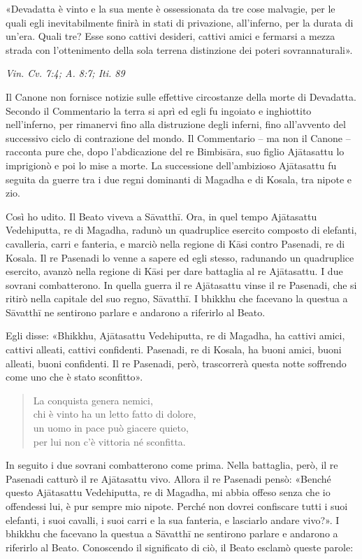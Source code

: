 «Devadatta è vinto e la sua mente è ossessionata da tre cose malvagie,
per le quali egli inevitabilmente finirà in stati di privazione,
all’inferno, per la durata di un’era. Quali tre? Esse sono cattivi
desideri, cattivi amici e fermarsi a mezza strada con l’ottenimento
della sola terrena distinzione dei poteri sovrannaturali».


\emph{Vin. Cv. 7:4; A. 8:7; Iti. 89}


 Il Canone non fornisce notizie sulle effettive
circostanze della morte di Devadatta. Secondo il Commentario la terra si
aprì ed egli fu ingoiato e inghiottito nell’inferno, per rimanervi fino
alla distruzione degli inferni, fino all’avvento del successivo ciclo di
contrazione del mondo. Il Commentario – ma non il Canone – racconta pure
che, dopo l’abdicazione del re Bimbisāra, suo figlio Ajātasattu lo
imprigionò e poi lo mise a morte. La successione dell’ambizioso
Ajātasattu fu seguita da guerre tra i due regni dominanti di Magadha e
di Kosala, tra nipote e zio.


 Così ho udito. Il Beato viveva a Sāvatthī. Ora, in quel
tempo Ajātasattu Vedehiputta, re di Magadha, radunò un quadruplice
esercito composto di elefanti, cavalleria, carri e fanteria, e marciò
nella regione di Kāsi contro Pasenadi, re di Kosala. Il re Pasenadi lo
venne a sapere ed egli stesso, radunando un quadruplice esercito, avanzò
nella regione di Kāsi per dare battaglia al re Ajātasattu. I due sovrani
combatterono. In quella guerra il re Ajātasattu vinse il re Pasenadi,
che si ritirò nella capitale del suo regno, Sāvatthī. I bhikkhu che
facevano la questua a Sāvatthī ne sentirono parlare e andarono a
riferirlo al Beato.


Egli disse: «Bhikkhu, Ajātasattu Vedehiputta, re di Magadha, ha cattivi amici,
cattivi alleati, cattivi confidenti. Pasenadi, re di Kosala, ha buoni
amici, buoni alleati, buoni confidenti. Il re Pasenadi, però,
trascorrerà questa notte soffrendo come uno che è stato sconfitto».


\begin{quote}
La conquista genera nemici, \\
chi è vinto ha un letto fatto di dolore, \\
un uomo in pace può giacere quieto, \\
per lui non c’è vittoria né sconfitta.
\end{quote}

In seguito i due sovrani combatterono come prima. Nella battaglia, però,
il re Pasenadi catturò il re Ajātasattu vivo. Allora il re Pasenadi
pensò: «Benché questo Ajātasattu Vedehiputta, re di Magadha, mi abbia
offeso senza che io offendessi lui, è pur sempre mio nipote. Perché non
dovrei confiscare tutti i suoi elefanti, i suoi cavalli, i suoi carri e
la sua fanteria, e lasciarlo andare vivo?». I bhikkhu che facevano la
questua a Sāvatthī ne sentirono parlare e andarono a riferirlo al Beato.
Conoscendo il significato di ciò, il Beato esclamò queste parole:


